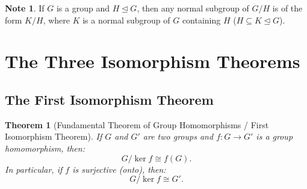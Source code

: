 \documentclass[12pt]{article}
\theoremstyle{definition}
\newtheorem*{note}{Note}
\theoremstyle{plain}
\newtheorem{theorem}{Theorem}[section]
\begin{document}
\begin{note}
If $G$ is a group and $H \trianglelefteq G$, then any normal subgroup of $G/H$ is of the form $K/H$, where $K$ is a normal subgroup of $G$ containing $H$ ($H \subseteq K \trianglelefteq G$).
\end{note}

\newpage
\section{The Three Isomorphism Theorems}

\subsection{The First Isomorphism Theorem}

\begin{theorem}[Fundamental Theorem of Group Homomorphisms / First Isomorphism Theorem]
If $G$ and $G'$ are two groups and $f: G \to G'$ is a group homomorphism, then:
\[
G/\ker f \cong f(G).
\]
In particular, if $f$ is surjective (onto), then:
\[
G/\ker f \cong G'.
\]
\end{theorem}
\end{document}
